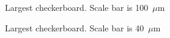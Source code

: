 \begin{figure}[!t]
    \begin{subfigure}[t]{0.24\linewidth}
    	\centering
    	\caption{Largest checkerboard. Scale bar is 100~$\mu$m}
    	\label{fig:b2d26_q26}
    \end{subfigure}
    \hfill
    \begin{subfigure}[t]{0.24\linewidth}
    	\centering
    	\caption{Largest checkerboard. Scale bar is 40~$\mu$m}
    	\label{fig:b2d27_q27}
    \end{subfigure}
    \hfill
    \begin{subfigure}[t]{0.24\linewidth}

\end{subfigure}
\end{figure}
